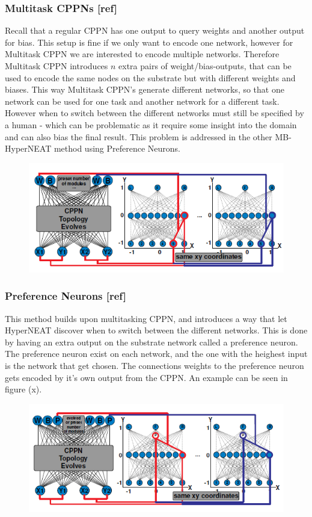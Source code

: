 \documentclass[11pt, a4paper]{article}
\begin{document}
\subsubsection{Multitask CPPNs [ref]}
Recall that a regular CPPN has one output to query weights and another output for bias. This setup is fine if we only want to encode one network, however for Multitask CPPN we are interested to encode multiple networks. Therefore Multitask CPPN introduces $ n $ extra pairs of weight/bias-outputs, that can be used to encode the same nodes on the substrate but with different weights and biases. This way Multitask CPPN's generate different networks, so that one network can be used for one task and another network for a different task. However when to switch between the different networks must still be specified by a human - which can be problematic as it require some insight into the domain and can also bias the final result. This problem is addressed in the other MB-HyperNEAT method using Preference Neurons.
\begin{figure}[!ht]
\centering
\includegraphics[scale=0.6]{MultitaskCPPN}
\caption{}
\end{figure}
\subsubsection{Preference Neurons [ref]}
This method builds upon multitasking CPPN, and introduces a way that let HyperNEAT discover when to switch between the different networks. This is done by having an extra output on the substrate network called a preference neuron. The preference neuron exist on each network, and the one with the heighest input is the network that get chosen. The connections weights to the preference neuron gets encoded by it's own output from the CPPN. An example can be seen in figure (x).
\begin{figure}[!ht]
\centering
\includegraphics[scale=0.6]{PreferenceNeurons}
\caption{}
\end{figure}
\end{document}
